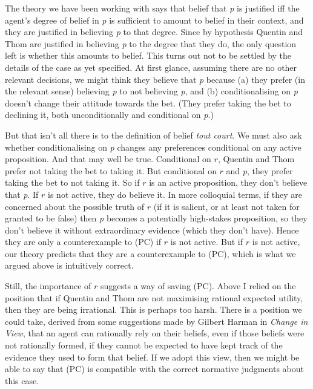 \documentclass[
  11pt,
  letterpaper,
  DIV=11,
  numbers=noendperiod,
  oneside]{scrartcl}
\begin{document}
The theory we have been working with says that belief that \emph{p} is
justified iff the agent's degree of belief in \emph{p} is sufficient to
amount to belief in their context, and they are justified in believing
\emph{p} to that degree. Since by hypothesis Quentin and Thom are
justified in believing \emph{p} to the degree that they do, the only
question left is whether this amounts to belief. This turns out not to
be settled by the details of the case as yet specified. At first glance,
assuming there are no other relevant decisions, we might think they
believe that \emph{p} because (a) they prefer (in the relevant sense)
believing \emph{p} to not believing \emph{p}, and (b) conditionalising
on \emph{p} doesn't change their attitude towards the bet. (They prefer
taking the bet to declining it, both unconditionally and conditional on
\emph{p}.)

But that isn't all there is to the definition of belief \emph{tout
court}. We must also ask whether conditionalising on \emph{p} changes
any preferences conditional on any active proposition. And that may well
be true. Conditional on \(r\), Quentin and Thom prefer not taking the
bet to taking it. But conditional on \(r\) and \emph{p}, they prefer
taking the bet to not taking it. So if \(r\) is an active proposition,
they don't believe that \emph{p}. If \(r\) is not active, they do
believe it. In more colloquial terms, if they are concerned about the
possible truth of \(r\) (if it is salient, or at least not taken for
granted to be false) then \emph{p} becomes a potentially high-stakes
proposition, so they don't believe it without extraordinary evidence
(which they don't have). Hence they are only a counterexample to (PC) if
\(r\) is not active. But if \(r\) is not active, our theory predicts
that they are a counterexample to (PC), which is what we argued above is
intuitively correct.

Still, the importance of \(r\) suggests a way of saving (PC). Above I
relied on the position that if Quentin and Thom are not maximising
rational expected utility, then they are being irrational. This is
perhaps too harsh. There is a position we could take, derived from some
suggestions made by Gilbert Harman in \emph{Change in View}, that an
agent can rationally rely on their beliefs, even if those beliefs were
not rationally formed, if they cannot be expected to have kept track of
the evidence they used to form that belief. If we adopt this view, then
we might be able to say that (PC) is compatible with the correct
normative judgments about this case.
\end{document}
